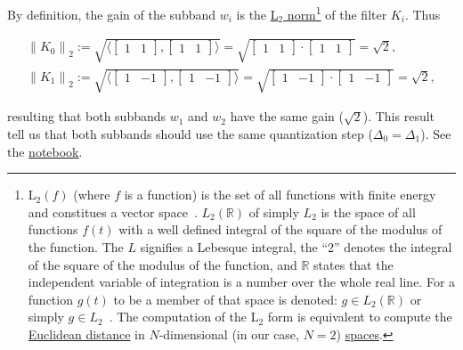By definition, the gain of the subband
$w_i$ is the \href{https://en.wikipedia.org/wiki/Lp_space}{L$_2$
  norm}\footnote{L$_2(f)$ (where $f$ is a function) is the set of all
  functions with finite energy and constitues a vector
  space~\cite{sayood2017introduction}. $L_2({\mathbb R})$ of simply
  $L_2$ is the space of all functions $f(t)$ with a well defined
  integral of the square of the modulus of the function. The $L$
  signifies a Lebesque integral, the ``2'' denotes the integral of the
  square of the modulus of the function, and ${\mathbb R}$ states that
  the independent variable of integration is a number over the whole
  real line. For a function $g(t)$ to be a member of that space is
  denoted: $g\in L_2({\mathbb R})$ or simply
  $g\in L_2$~\cite{burrus2013wavelets}. The computation of the L$_2$
  form is equivalent to compute the
  \href{https://en.wikipedia.org/wiki/Euclidean_distance}{Euclidean
    distance} in $N$-dimensional (in our case, $N=2$)
  \href{https://en.wikipedia.org/wiki/Vector_space}{spaces}.} of the
filter $K_i$. Thus

\begin{equation}
  \begin{array}{l}
    \left\| K_0 \right\|_2 := \sqrt{\langle \begin{bmatrix}1 & 1\end{bmatrix}, \begin{bmatrix}1 & 1\end{bmatrix} \rangle} = \sqrt{\begin{bmatrix}1 & 1\end{bmatrix}\cdot \begin{bmatrix}1 & 1\end{bmatrix}} = \sqrt{2},\\
    \left\| K_1 \right\|_2 := \sqrt{\langle \begin{bmatrix}1 & -1\end{bmatrix}, \begin{bmatrix}1 & -1\end{bmatrix} \rangle} = \sqrt{\begin{bmatrix}1 & -1\end{bmatrix}\cdot \begin{bmatrix}1 & -1\end{bmatrix}} = \sqrt{2},
  \end{array}
\end{equation}

resulting that both subbands $w_1$ and $w_2$ have the same gain
($\sqrt{2}$). This result tell us that both subbands should use the
same quantization step ($\Delta_0=\Delta_1$). See the
\href{https://github.com/Tecnologias-multimedia/intercom/blob/master/docs/stereo_transforms_RD.ipynb}{notebook}.

